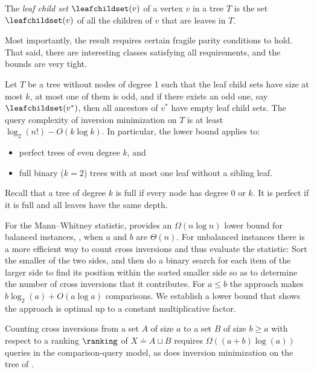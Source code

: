\begin{definition}\label{def:leaf-child-set} The \emph{leaf child set} $\leafchildset(v)$ of a vertex $v$ in a tree $T$ is the set $\leafchildset(v)$ of all the children of $v$ that are leaves in $T$.
\end{definition}
Most importantly, the result requires certain fragile parity conditions to hold. That said, there are interesting classes satisfying all requirements, and the bounds are very tight. 
\begin{theorem}\label{thm:main:special}
Let $T$ be a tree without nodes of degree 1 such that the leaf child sets have size at most $k$, at most one of them is odd, and if there exists an odd one, say $\leafchildset(v^*)$, then all ancestors of $v^*$ have empty leaf child sets. The query complexity of inversion minimization on $T$ is at least $\log_2(n!) - O(k \log k)$. In particular, the lower bound applies to:
\begin{itemize}
\item perfect trees of even degree $k$, and
\item full binary ($k=2$) trees with at most one leaf without a sibling leaf.
\end{itemize}
\end{theorem}
Recall that a tree of degree $k$ is full if every node has degree 0 or $k$. It is perfect if it is full and all leaves have the same depth.

For the Mann--Whitney statistic,  provides an $\Omega(n \log n)$ lower bound for balanced instances, \ie, when $a$ and $b$ are $\Theta(n)$. For unbalanced instances there is a more efficient way to count cross inversions and thus evaluate the statistic: Sort the smaller of the two sides, and then do a binary search for each item of the larger side to find its position within the sorted smaller side so as to determine the number of cross inversions that it contributes. For $a \le b$ the approach makes $b \log_2(a) + O(a \log a)$ comparisons. We establish a lower bound that shows the approach is optimal up to a constant multiplicative factor.
\begin{theorem}\label{thm:Mann-Whitney}
Counting cross inversions from a set $A$ of size $a$ to a set $B$ of size $b \ge a$ with respect to a ranking $\ranking$ of $X \doteq A \sqcup B$ requires $\Omega((a+b)\log(a))$ queries in the comparison-query model, as does inversion minimization on the tree of .
\end{theorem}

